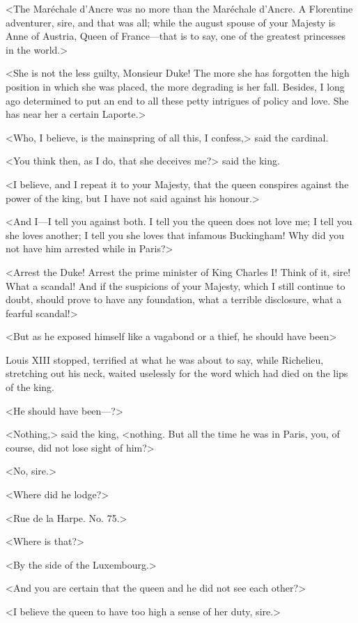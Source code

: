 <The Maréchale d'Ancre was no more than the Maréchale d'Ancre. A Florentine adventurer, sire, and that was all; while the august spouse of your Majesty is Anne of Austria, Queen of France---that is to say, one of the greatest princesses in the world.> 

<She is not the less guilty, Monsieur Duke! The more she has forgotten the high position in which she was placed, the more degrading is her fall. Besides, I long ago determined to put an end to all these petty intrigues of policy and love. She has near her a certain Laporte.> 

<Who, I believe, is the mainspring of all this, I confess,> said the cardinal. 

<You think then, as I do, that she deceives me?> said the king. 

<I believe, and I repeat it to your Majesty, that the queen conspires against the power of the king, but I have not said against his honour.> 

<And I---I tell you against both. I tell you the queen does not love me; I tell you she loves another; I tell you she loves that infamous Buckingham! Why did you not have him arrested while in Paris?> 

<Arrest the Duke! Arrest the prime minister of King Charles I! Think of it, sire! What a scandal! And if the suspicions of your Majesty, which I still continue to doubt, should prove to have any foundation, what a terrible disclosure, what a fearful scandal!> 

<But as he exposed himself like a vagabond or a thief, he should have been\longdash> 

Louis XIII stopped, terrified at what he was about to say, while Richelieu, stretching out his neck, waited uselessly for the word which had died on the lips of the king. 

<He should have been---?> 

<Nothing,> said the king, <nothing. But all the time he was in Paris, you, of course, did not lose sight of him?> 

<No, sire.> 

<Where did he lodge?> 

<Rue de la Harpe. No. 75.> 

<Where is that?> 

<By the side of the Luxembourg.> 

<And you are certain that the queen and he did not see each other?> 

<I believe the queen to have too high a sense of her duty, sire.> 

